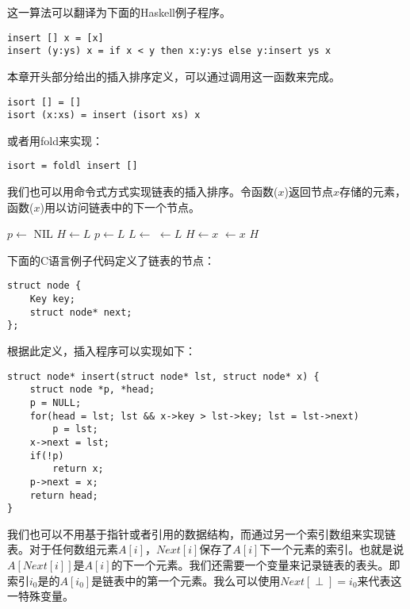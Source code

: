 \documentclass{ctexart}
\begin{document}
这一算法可以翻译为下面的Haskell例子程序。

\begin{lstlisting}[style=Haskell]
insert [] x = [x]
insert (y:ys) x = if x < y then x:y:ys else y:insert ys x
\end{lstlisting}

本章开头部分给出的插入排序定义，可以通过调用这一函数来完成。

\begin{lstlisting}[style=Haskell]
isort [] = []
isort (x:xs) = insert (isort xs) x
\end{lstlisting}

或者用fold来实现：

\begin{lstlisting}[style=Haskell]
isort = foldl insert []
\end{lstlisting}

我们也可以用命令式方式实现链表的插入排序。令函数($x$)返回节点$x$存储的元素，函数($x$)用以访问链表中的下一个节点。

\begin{algorithmic}[1]
  \State $p \gets$ NIL
  \State $H \gets L$
    \State $p \gets L$
    \State $L \gets $ 
  \EndWhile
  \State {} $\gets L$
    \State $H \gets x$
  \Else
    \State {} $\gets x$
  \EndIf
  \State \Return $H$
\EndFunction
\end{algorithmic}

下面的C语言例子代码定义了链表的节点：

\lstset{language=C}
\begin{lstlisting}
struct node {
    Key key;
    struct node* next;
};
\end{lstlisting}

根据此定义，插入程序可以实现如下：

\begin{lstlisting}
struct node* insert(struct node* lst, struct node* x) {
    struct node *p, *head;
    p = NULL;
    for(head = lst; lst && x->key > lst->key; lst = lst->next)
        p = lst;
    x->next = lst;
    if(!p)
        return x;
    p->next = x;
    return head;
}
\end{lstlisting}

我们也可以不用基于指针或者引用的数据结构，而通过另一个索引数组来实现链表。对于任何数组元素$A[i]$，$Next[i]$保存了$A[i]$下一个元素的索引。也就是说$A[Next[i]]$是$A[i]$的下一个元素。我们还需要一个变量来记录链表的表头。即索引$i_0$是的$A[i_0]$是链表中的第一个元素。我么可以使用$Next[\perp] = i_0$来代表这一特殊变量。
\end{document}
